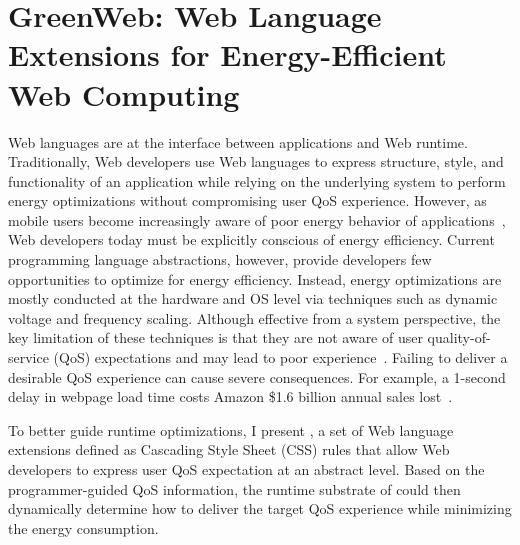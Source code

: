 
\chapter{GreenWeb: Web Language Extensions for Energy-Efficient Web Computing}
\label{sec:lang}


Web languages are at the interface between applications and Web runtime. Traditionally, Web developers use Web languages to express structure, style, and functionality of an application while relying on the underlying system to perform energy optimizations without compromising user QoS experience. However, as mobile users become increasingly aware of poor energy behavior of applications~\cite{badappreviews,appdeletion}, Web developers today must be  explicitly conscious of energy efficiency. Current programming language abstractions, however, provide developers few opportunities to optimize for energy efficiency. Instead, energy optimizations are mostly conducted at the hardware and OS level via techniques such as dynamic voltage and frequency scaling. Although effective from a system perspective, the key limitation of these techniques is that they are not aware of user quality-of-service (QoS) expectations and may lead to poor experience~\cite{big-little,ebs,pgdvfs}. Failing to deliver a desirable QoS experience can cause severe consequences. For example, a 1-second delay in webpage load time costs Amazon \$1.6 billion annual sales lost~\cite{Eaton:2013uq}.

To better guide runtime optimizations, I present \greenweb, a set of Web language extensions defined as Cascading Style Sheet (CSS) rules that allow Web developers to express user QoS expectation at an abstract level. Based on the programmer-guided QoS information, the runtime substrate of \greenweb could then dynamically determine how to deliver the target QoS experience while minimizing the energy consumption.

